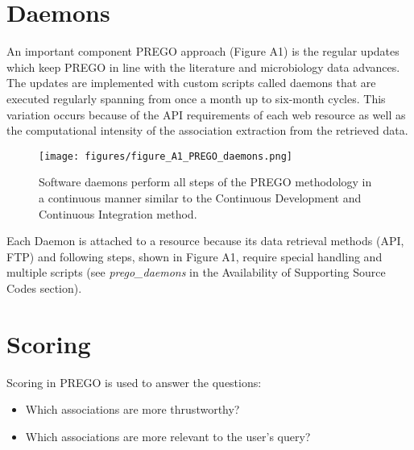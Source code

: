 {\section{Daemons}
\label{app:B}

An important component PREGO approach (Figure A1) is the regular updates which keep PREGO in line with the literature and microbiology data advances. 
The updates are implemented with custom scripts called daemons that are executed regularly spanning from once a month up to six-month cycles. 
This variation occurs because of the API requirements of each web resource as well as the computational intensity of the association extraction from the retrieved data.

\begin{figure}[ht]
   \centering
   \texttt{[image: figures/figure\_A1\_PREGO\_daemons.png]}
   \caption[PREGO DevOps]{Software daemons perform all steps of the PREGO methodology in a continuous manner similar to the Continuous Development and Continuous Integration method.}
   \label{fig:devops}
\end{figure}


Each Daemon is attached to a resource because its data retrieval methods (API, FTP) and following steps, shown in Figure A1, require special handling and multiple scripts (see \textit{prego\_daemons} in the Availability of Supporting Source Codes section).

\section{Scoring}
\label{app:C}


Scoring in PREGO is used to answer the questions:
\begin{itemize}
   \item Which associations are more thrustworthy?
   \item Which associations are more relevant to the user's query?
\end{itemize}

}
